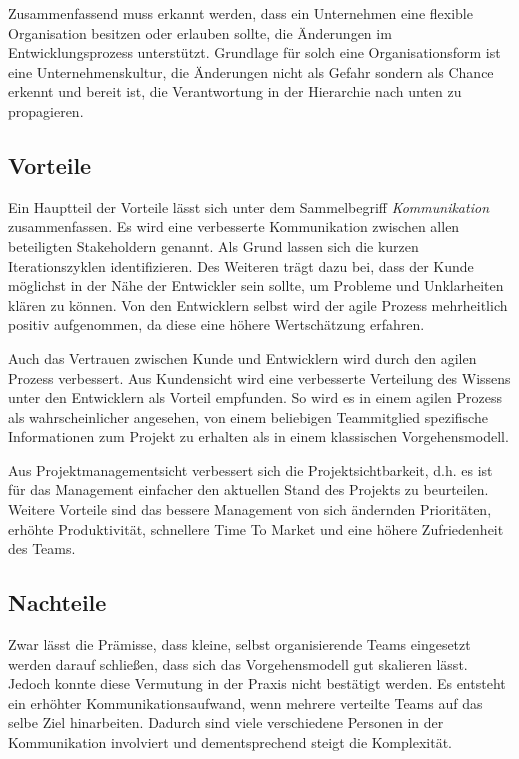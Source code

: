 Zusammenfassend muss erkannt werden, dass ein Unternehmen eine flexible Organisation besitzen oder erlauben sollte, die Änderungen im Entwicklungsprozess unterstützt.
Grundlage für solch eine Organisationsform ist eine Unternehmenskultur, die Änderungen nicht als Gefahr sondern als Chance erkennt und bereit ist, die Verantwortung in der Hierarchie nach unten zu propagieren.

\subsection{Vorteile} %

Ein Hauptteil der Vorteile lässt sich unter dem Sammelbegriff \emph{Kommunikation} zusammenfassen.
Es wird eine verbesserte Kommunikation zwischen allen beteiligten Stakeholdern genannt.
Als Grund lassen sich die kurzen Iterationszyklen identifizieren. 
Des Weiteren trägt dazu bei, dass der Kunde möglichst in der Nähe der Entwickler sein sollte, um Probleme und Unklarheiten klären zu können.
Von den Entwicklern selbst wird der agile Prozess mehrheitlich positiv aufgenommen, da diese eine höhere Wertschätzung erfahren.
\parencite[Vgl.][S. 658]{Petersen:2010aa}

Auch das Vertrauen zwischen Kunde und Entwicklern wird durch den agilen Prozess verbessert.
Aus Kundensicht wird eine verbesserte Verteilung des Wissens unter den Entwicklern als Vorteil empfunden.
So wird es in einem agilen Prozess als wahrscheinlicher angesehen, von einem beliebigen Teammitglied spezifische Informationen zum Projekt zu erhalten als in einem klassischen Vorgehensmodell.
\parencite[Vgl.][S. 498 f.]{Bomarius:2005aa}

Aus Projektmanagementsicht verbessert sich die Projektsichtbarkeit, d.h. es ist für das Management einfacher den aktuellen Stand des Projekts zu beurteilen.
Weitere Vorteile sind das bessere Management von sich ändernden Prioritäten, erhöhte Produktivität, schnellere Time To Market und eine höhere Zufriedenheit des Teams.
\parencite[Vgl.][]{VersionOne:2015aa}

\subsection{Nachteile} %

Zwar lässt die Prämisse, dass kleine, selbst organisierende Teams eingesetzt werden darauf schließen, dass sich das Vorgehensmodell gut skalieren lässt. 
Jedoch konnte diese Vermutung in der Praxis nicht bestätigt werden. 
Es entsteht ein erhöhter Kommunikationsaufwand, wenn mehrere verteilte Teams auf das selbe Ziel hinarbeiten.
Dadurch sind viele verschiedene Personen in der Kommunikation involviert und dementsprechend steigt die Komplexität.
\parencite[Vgl.][S. 1481]{Petersen20091479}

